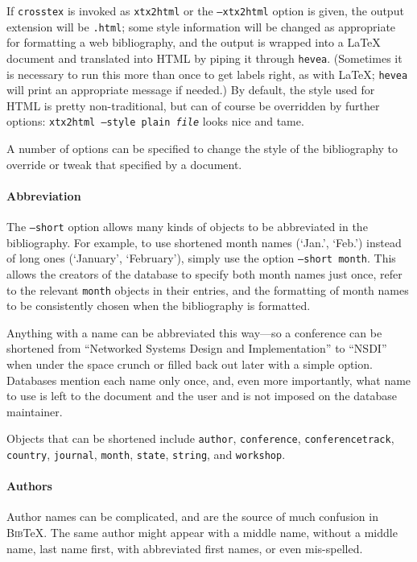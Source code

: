\documentclass{article}
\newcommand{\BibTeX}{\textsc{Bib}\TeX}
\begin{document}
If \texttt{crosstex} is invoked as \texttt{xtx2html} or the \texttt{--xtx2html} option is given, the output extension will be \texttt{.html}; some style information will be changed as appropriate for formatting a web bibliography, and the output is wrapped into a \LaTeX{} document and translated into HTML by piping it through \texttt{hevea}. (Sometimes it is necessary to run this more than once to get labels right, as with \LaTeX{}; \texttt{hevea} will print an appropriate message if needed.) By default, the style used for HTML is pretty non-traditional, but can of course be overridden by further options: \texttt{xtx2html --style plain \textrm{\textit{file}}} looks nice and tame.

A number of options can be specified to change the style of the bibliography to override or tweak that specified by a document.

\paragraph{Abbreviation}

The \texttt{--short} option allows many kinds of objects to be abbreviated in the bibliography. For example, to use shortened month names (`Jan.', `Feb.') instead of long ones (`January', `February'), simply use the option \texttt{--short month}. This allows the creators of the database to specify both month names just once, refer to the relevant \texttt{month} objects in their entries, and the formatting of month names to be consistently chosen when the bibliography is formatted.

Anything with a name can be abbreviated this way---so a conference can be shortened from ``Networked Systems Design and Implementation'' to ``NSDI'' when under the space crunch or filled back out later with a simple option. Databases mention each name only once, and, even more importantly, what name to use is left to the document and the user and is not imposed on the database maintainer.

Objects that can be shortened include \texttt{author}, \texttt{conference}, \texttt{conferencetrack}, \texttt{country}, \texttt{journal}, \texttt{month}, \texttt{state}, \texttt{string}, and \texttt{workshop}.

\paragraph{Authors}

Author names can be complicated, and are the source of much confusion
in \BibTeX{}. The same author might appear with a middle name, without
a middle name, last name first, with abbreviated first names, or even
mis-spelled. 
\end{document}
